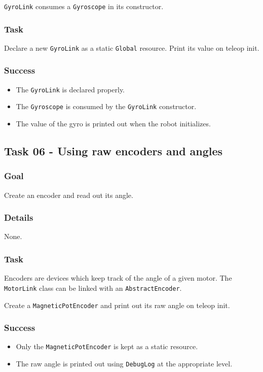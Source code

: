 \documentclass[a4paper]{article}
\begin{document}
\lstinline{GyroLink} consumes a \lstinline{Gyroscope} in its constructor.
\subsubsection{Task} Declare a new \lstinline{GyroLink} as a static \lstinline{Global} resource. Print its value on teleop init.
\subsubsection{Success}\begin{itemize}\item{The \lstinline{GyroLink} is declared properly.}\item{The \lstinline{Gyroscope} is consumed by the \lstinline{GyroLink} constructor.}\item{The value of the gyro is printed out when the robot initializes.}\end{itemize}

\subsection{Task 06 - Using raw encoders and angles}
\subsubsection{Goal} Create an encoder and read out its angle.
\subsubsection{Details} None.
\subsubsection{Task} Encoders are devices which keep track of the angle of a given motor. The \lstinline{MotorLink} class can be linked with an \lstinline{AbstractEncoder}.

Create a \lstinline{MagneticPotEncoder} and print out its raw angle on teleop init.
\subsubsection{Success} \begin{itemize}\item{Only the \lstinline{MagneticPotEncoder} is kept as a static resource.}\item{The raw angle is printed out using \lstinline{DebugLog} at the appropriate level.}\end{itemize}
\end{document}
